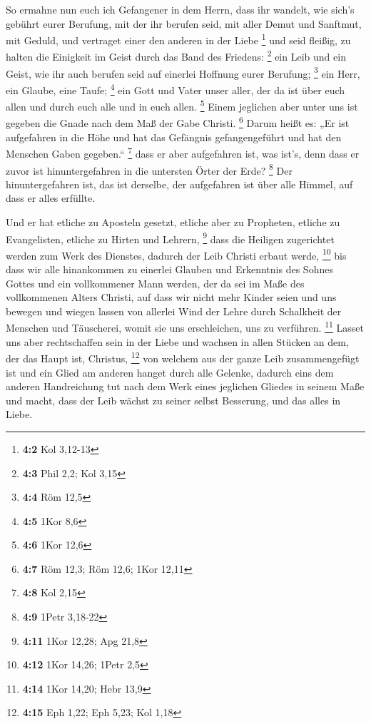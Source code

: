  So ermahne nun euch ich Gefangener in dem Herrn, dass ihr
wandelt, wie sich's gebührt eurer Berufung, mit der ihr berufen seid,
 mit aller Demut und Sanftmut, mit Geduld, und vertraget
einer den anderen in der Liebe \footnote{\textbf{4:2} Kol 3,12-13}
 und seid fleißig, zu halten die Einigkeit im Geist durch
das Band des Friedens: \footnote{\textbf{4:3} Phil 2,2; Kol 3,15}
 ein Leib und ein Geist, wie ihr auch berufen seid auf
einerlei Hoffnung eurer Berufung; \footnote{\textbf{4:4} Röm 12,5}
 ein Herr, ein Glaube, eine Taufe; \footnote{\textbf{4:5}
  1Kor 8,6}  ein Gott und Vater unser aller, der da ist
über euch allen und durch euch alle und in euch allen. \footnote{\textbf{4:6}
  1Kor 12,6}  Einem jeglichen aber unter uns ist gegeben
die Gnade nach dem Maß der Gabe Christi. \footnote{\textbf{4:7} Röm
  12,3; Röm 12,6; 1Kor 12,11}  Darum heißt es: „Er ist
aufgefahren in die Höhe und hat das Gefängnis gefangengeführt und hat
den Menschen Gaben gegeben.`` \footnote{\textbf{4:8} Kol 2,15}
 dass er aber aufgefahren ist, was ist's, denn dass er
zuvor ist hinuntergefahren in die untersten Örter der Erde? \footnote{\textbf{4:9}
  1Petr 3,18-22}  Der hinuntergefahren ist, das ist
derselbe, der aufgefahren ist über alle Himmel, auf dass er alles
erfüllte.

 Und er hat etliche zu Aposteln gesetzt, etliche aber zu
Propheten, etliche zu Evangelisten, etliche zu Hirten und Lehrern,
\footnote{\textbf{4:11} 1Kor 12,28; Apg 21,8}  dass die
Heiligen zugerichtet werden zum Werk des Dienstes, dadurch der Leib
Christi erbaut werde, \footnote{\textbf{4:12} 1Kor 14,26; 1Petr 2,5}
 bis dass wir alle hinankommen zu einerlei Glauben und
Erkenntnis des Sohnes Gottes und ein vollkommener Mann werden, der da
sei im Maße des vollkommenen Alters Christi,  auf dass
wir nicht mehr Kinder seien und uns bewegen und wiegen lassen von
allerlei Wind der Lehre durch Schalkheit der Menschen und Täuscherei,
womit sie uns erschleichen, uns zu verführen. \footnote{\textbf{4:14}
  1Kor 14,20; Hebr 13,9}  Lasset uns aber rechtschaffen
sein in der Liebe und wachsen in allen Stücken an dem, der das Haupt
ist, Christus, \footnote{\textbf{4:15} Eph 1,22; Eph 5,23; Kol 1,18}
 von welchem aus der ganze Leib zusammengefügt ist und
ein Glied am anderen hanget durch alle Gelenke, dadurch eins dem anderen
Handreichung tut nach dem Werk eines jeglichen Gliedes in seinem Maße
und macht, dass der Leib wächst zu seiner selbst Besserung, und das
alles in Liebe.

